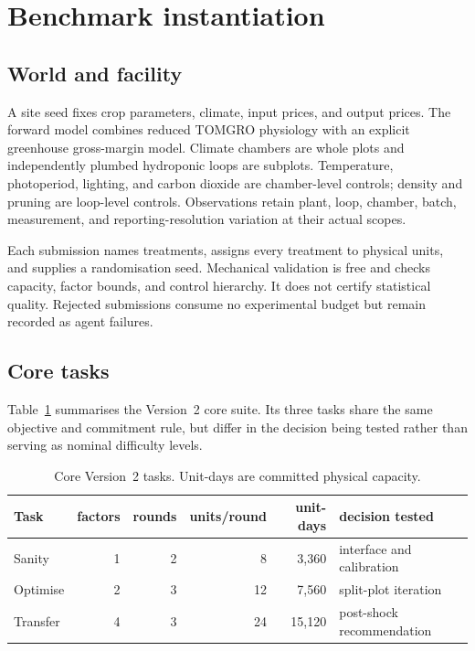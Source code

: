 \section{Benchmark instantiation}
\label{sec:benchmark}

\subsection{World and facility}
A site seed fixes crop parameters, climate, input prices, and output prices. The forward
model combines reduced TOMGRO physiology with an explicit greenhouse gross-margin model.
Climate chambers are whole plots and independently plumbed hydroponic loops are subplots.
Temperature, photoperiod, lighting, and carbon dioxide are chamber-level controls; density
and pruning are loop-level controls. Observations retain plant, loop, chamber, batch,
measurement, and reporting-resolution variation at their actual scopes.

Each submission names treatments, assigns every treatment to physical units, and supplies a
randomisation seed. Mechanical validation is free and checks capacity, factor bounds, and
control hierarchy. It does not certify statistical quality. Rejected submissions consume no
experimental budget but remain recorded as agent failures.

\subsection{Core tasks}
Table~\ref{tab:tasks} summarises the Version~2 core suite. Its three tasks share the same objective and commitment rule, but differ in the decision being tested rather than serving as nominal difficulty levels.

\begin{table}[t]
\centering\small
\begin{tabular}{@{}lrrrrl@{}}
\toprule
Task & factors & rounds & units/round & unit-days & decision tested \\
\midrule
Sanity   & 1 & 2 & 8  & 3,360  & interface and calibration \\
Optimise & 2 & 3 & 12 & 7,560  & split-plot iteration \\
Transfer & 4 & 3 & 24 & 15,120 & post-shock recommendation \\
\bottomrule
\end{tabular}
\caption{Core Version~2 tasks. Unit-days are committed physical capacity.}
\label{tab:tasks}
\end{table}

